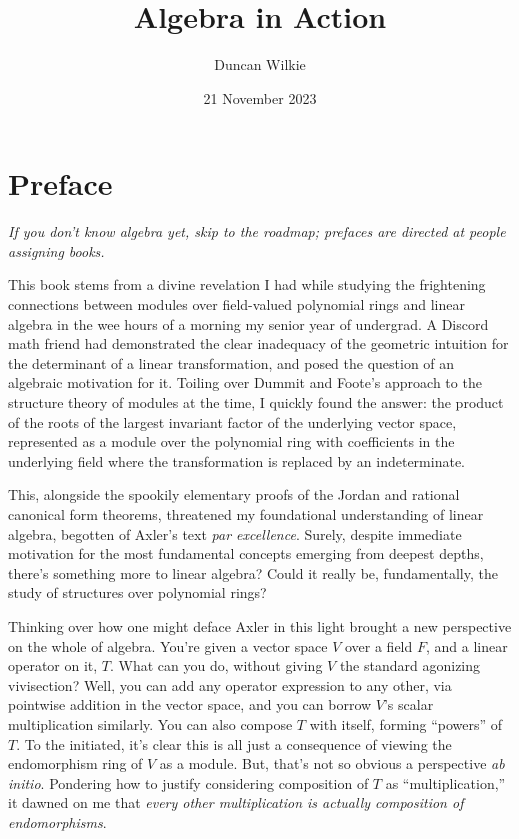 \documentclass{book}
\title{Algebra in Action}
\author{Duncan Wilkie}
\date{21 November 2023}
\begin{document}
\maketitle

\chapter*{Preface}

\textit{If you don't know algebra yet, skip to the roadmap; prefaces are directed at people assigning books.}
\vspace{20pt}

This book stems from a divine revelation I had while studying the frightening connections
between modules over field-valued polynomial rings and linear algebra in the wee hours of a morning my senior year of undergrad.
A Discord math friend had demonstrated the clear inadequacy of the geometric intuition for the determinant of a linear transformation,
and posed the question of an algebraic motivation for it.
Toiling over Dummit and Foote's approach to the structure theory of modules at the time, I quickly found the answer:
the product of the roots of the largest invariant factor of the underlying vector space, represented as a module over the polynomial ring
with coefficients in the underlying field where the transformation is replaced by an indeterminate.

This, alongside the spookily elementary proofs of the Jordan and rational canonical form theorems,
threatened my foundational understanding of linear algebra, begotten of Axler's text \textit{par excellence}.
Surely, despite immediate motivation for the most fundamental concepts emerging from deepest depths, there's something more to linear algebra?
Could it really be, fundamentally, the study of structures over polynomial rings?

Thinking over how one might deface Axler in this light brought a new perspective on the whole of algebra.
You're given a vector space $V$ over a field $F$, and a linear operator on it, $T$.
What can you do, without giving $V$ the standard agonizing vivisection?
Well, you can add any operator expression to any other, via pointwise addition in the vector space,
and you can borrow $V$'s scalar multiplication similarly.
You can also compose $T$ with itself, forming ``powers'' of $T$.
To the initiated, it's clear this is all just a consequence of viewing the endomorphism ring of $V$ as a module.
But, that's not so obvious a perspective \textit{ab initio}.
Pondering how to justify considering composition of $T$ as ``multiplication,'' it dawned on me that
\textit{every other multiplication is actually composition of endomorphisms}.
\end{document}
